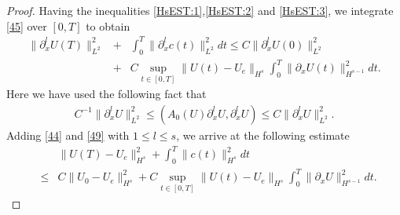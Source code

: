 \documentclass{article}
\theoremstyle{plain}
\begin{document}
\begin{proof}
Having the inequalities \eqref{HsEST:1},\eqref{HsEST:2} and \eqref{HsEST:3}, we integrate \eqref{45} over $[0,T]$ to obtain
\begin{eqnarray}\label{49}
  \|\partial^l_x U(T)\|_{L^2}^2&  + & \int_0^T \|\partial^l_x c(t)\|^2_{L^2}dt \le C\|\partial^l_x U(0)\|_{L^2}^2  \nonumber\\[3mm]
 & +& C\sup_{t \in [0,T]}\|U(t)-U_e\|_{H^s} \int_0^T \|\partial_x U(t)\|^2_{H^{s-1}}dt .
\end{eqnarray}
Here we have used the following fact that
\begin{eqnarray*}
   C^{-1} \|\partial^l_x U\|_{L^2}^2 \le  (A_0(U) \partial^l_x U,\partial^l_x U) \le C \|\partial^l_x U\|_{L^2}^2.
\end{eqnarray*}
Adding \eqref{44} and \eqref{49} with $1 \le l \le s$, we arrive at the following estimate
  \begin{eqnarray}\label{210}
    && \|U(T)-U_e\|^2_{H^{s}}  +  \int_0^T \|c(t)\|^2_{H^s} dt \nonumber \\
    & \le & C \|U_0-U_e\|_{H^{s}}^2 + C \sup_{t \in [0,T]} \|U(t) - U_e\|_{H^s} \int_0^T \|\partial_x U\|_{H^{s-1}}^2dt.
\end{eqnarray}


\end{proof}
\end{document}
